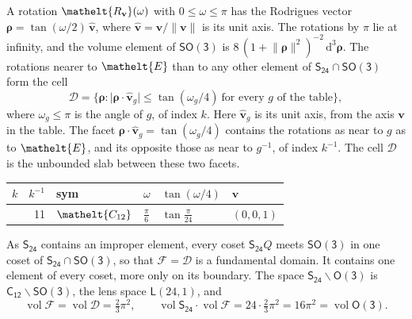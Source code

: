 \documentclass[10pt,a4paper]{article}
\numberwithin{equation}{section}
\newcommand{\eltfont}[1]{{\let\sigma\eltsigma\mathelt{#1}}}
\newcommand{\grp}[1]{\mathsf{#1}}
\newcommand{\cls}[1]{\eltfont{#1}}
\newcommand{\elt}[1]{\eltfont{#1}}
\newcommand{\dirvec}[3]{(#1, #2, #3)}
\newcommand{\unitaxis}{\hat{\mathbf{v}}}
\newcommand{\vv}{\mathbf{v}}
\newcommand{\diff}{\mathrm{d}}
\newcommand{\vol}{\operatorname{vol}}
\newcommand{\rodrigues}{\boldsymbol{\rho}}
\newcommand{\fcell}{\mathcal{D}}
\newcommand{\fdomain}{\mathcal{F}}
\newcommand{\lensspace}[2]{\mathsf{L}(#1, #2)}
\begin{document}
\leavevmode\label{n:vector.rodrigues}\label{n:vector.unitaxis}A rotation $\elt{R_{\vv}}(\omega)$ with $0 \le \omega \le \pi$ has the Rodrigues vector $\rodrigues = \tan(\omega/2)\,\unitaxis$, where $\unitaxis = \vv/\lVert\vv\rVert$ is its unit axis. The rotations by $\pi$ lie at infinity, and the volume element of \href{SO3.pdf}{$\grp{SO(3)}$} is $8\,(1 + \lVert\rodrigues\rVert^2)^{-2}\,\diff^3\rodrigues$.
\leavevmode\label{n:set.cell}The rotations nearer to $\elt{E}$ than to any other element of $\grp{S_{24}} \cap \grp{SO(3)}$ form the cell
\begin{equation}\label{e:cell}\fcell = \bigl\{\rodrigues : \lvert\rodrigues\cdot\unitaxis_g\rvert \le \tan(\omega_g/4)\ \text{for every $g$ of the table}\bigr\},\end{equation}
where $\omega_g \le \pi$ is the angle of $g$, of index $k$. Here $\unitaxis_g$ is its unit axis, from the axis $\vv$ in the table. The facet $\rodrigues\cdot\unitaxis_g = \tan(\omega_g/4)$ contains the rotations as near to $g$ as to $\elt{E}$, and its opposite those as near to $g^{-1}$, of index $k^{-1}$. The cell $\fcell$ is the unbounded slab between these two facets.
{\small{\renewcommand{\arraystretch}{1.3}\begin{longtable}{@{}rrllll@{}}\toprule
$k$ & $k^{-1}$ & sym & $\omega$ & $\tan(\omega/4)$ & $\vv$\\\midrule\endhead
\bottomrule\endfoot\endlastfoot
1 & 11 & $\cls{C_{12}}$ & $\tfrac{\pi}{6}$ & $\tan\tfrac{\pi}{24}$ & $\dirvec{0}{0}{1}$\\
\bottomrule\end{longtable}}}

\leavevmode\label{n:set.fundamental}As $\grp{S_{24}}$ contains an improper element, every coset $\grp{S_{24}}Q$ meets \href{SO3.pdf}{$\grp{SO(3)}$} in one coset of $\grp{S_{24}} \cap \grp{SO(3)}$, so that $\fdomain = \fcell$ is a fundamental domain. It contains one element of every coset, more only on its boundary.
\leavevmode\label{n:set.lens}The space $\grp{S_{24}}\backslash\grp{O(3)}$ is $\grp{C_{12}}\backslash\grp{SO(3)}$, the lens space $\lensspace{24}{1}$, and
\begin{equation}\label{e:volume}\vol\fdomain = \vol\fcell = \tfrac{2}{3}\pi^2,\qquad \vol\grp{S_{24}}\cdot\vol\fdomain = 24\cdot \tfrac{2}{3}\pi^2 = 16\pi^2 = \vol\grp{O(3)}.\end{equation}
\end{document}
